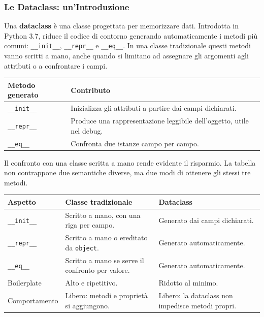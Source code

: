 \documentclass[12pt]{extarticle}
\begin{document}
\subsubsection{Le Dataclass: un'Introduzione}

\noindent Una \textbf{dataclass} è una classe progettata per memorizzare dati. Introdotta in Python 3.7, riduce il codice di contorno generando automaticamente i metodi più comuni: \texttt{\_\_init\_\_}, \texttt{\_\_repr\_\_} e \texttt{\_\_eq\_\_}. In una classe tradizionale questi metodi vanno scritti a mano, anche quando si limitano ad assegnare gli argomenti agli attributi o a confrontare i campi.

\begin{center}
\small
\begin{tabular}{p{4.0cm}p{9.6cm}}
    \toprule
    \textbf{Metodo generato} & \textbf{Contributo} \\
    \midrule
    \texttt{\_\_init\_\_} & Inizializza gli attributi a partire dai campi dichiarati. \\
    \addlinespace
    \texttt{\_\_repr\_\_} & Produce una rappresentazione leggibile dell'oggetto, utile nel debug. \\
    \addlinespace
    \texttt{\_\_eq\_\_} & Confronta due istanze campo per campo. \\
    \bottomrule
\end{tabular}
\end{center}

\noindent Il confronto con una classe scritta a mano rende evidente il risparmio. La tabella non contrappone due semantiche diverse, ma due modi di ottenere gli stessi tre metodi.

\begin{center}
\small
\begin{tabular}{p{3.6cm}p{5.4cm}p{5.4cm}}
    \toprule
    \textbf{Aspetto} & \textbf{Classe tradizionale} & \textbf{Dataclass} \\
    \midrule
    \texttt{\_\_init\_\_} & Scritto a mano, con una riga per campo. & Generato dai campi dichiarati. \\
    \addlinespace
    \texttt{\_\_repr\_\_} & Scritto a mano o ereditato da \texttt{object}. & Generato automaticamente. \\
    \addlinespace
    \texttt{\_\_eq\_\_} & Scritto a mano se serve il confronto per valore. & Generato automaticamente. \\
    \addlinespace
    Boilerplate & Alto e ripetitivo. & Ridotto al minimo. \\
    \addlinespace
    Comportamento & Libero: metodi e proprietà si aggiungono. & Libero: la dataclass non impedisce metodi propri. \\
    \bottomrule
\end{tabular}
\end{center}
\end{document}
